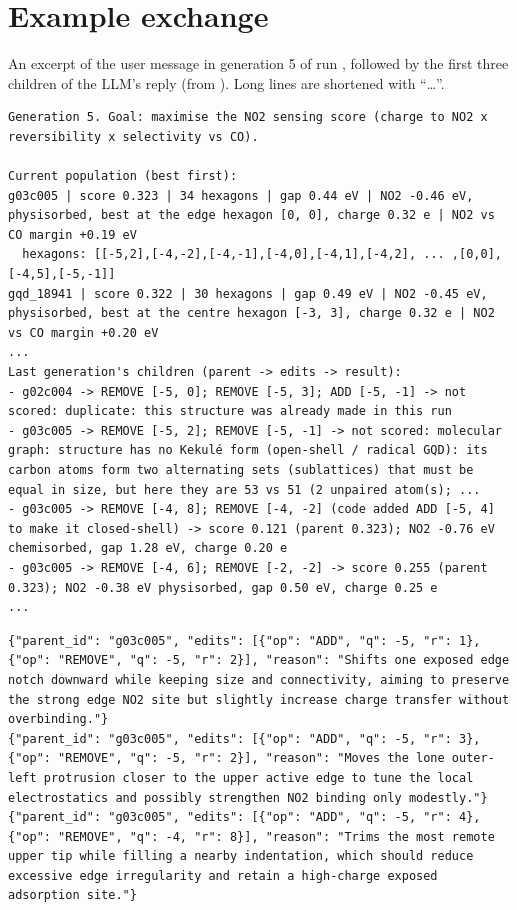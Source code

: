 \section{Example exchange}

An excerpt of the user message in generation 5 of run , followed by the first
three children of the LLM's reply (from ). Long lines are shortened with
``\ldots''.

\begin{lstlisting}
Generation 5. Goal: maximise the NO2 sensing score (charge to NO2 x reversibility x selectivity vs CO).

Current population (best first):
g03c005 | score 0.323 | 34 hexagons | gap 0.44 eV | NO2 -0.46 eV, physisorbed, best at the edge hexagon [0, 0], charge 0.32 e | NO2 vs CO margin +0.19 eV
  hexagons: [[-5,2],[-4,-2],[-4,-1],[-4,0],[-4,1],[-4,2], ... ,[0,0],[-4,5],[-5,-1]]
gqd_18941 | score 0.322 | 30 hexagons | gap 0.49 eV | NO2 -0.45 eV, physisorbed, best at the centre hexagon [-3, 3], charge 0.32 e | NO2 vs CO margin +0.20 eV
...
Last generation's children (parent -> edits -> result):
- g02c004 -> REMOVE [-5, 0]; REMOVE [-5, 3]; ADD [-5, -1] -> not scored: duplicate: this structure was already made in this run
- g03c005 -> REMOVE [-5, 2]; REMOVE [-5, -1] -> not scored: molecular graph: structure has no Kekulé form (open-shell / radical GQD): its carbon atoms form two alternating sets (sublattices) that must be equal in size, but here they are 53 vs 51 (2 unpaired atom(s); ...
- g03c005 -> REMOVE [-4, 8]; REMOVE [-4, -2] (code added ADD [-5, 4] to make it closed-shell) -> score 0.121 (parent 0.323); NO2 -0.76 eV chemisorbed, gap 1.28 eV, charge 0.20 e
- g03c005 -> REMOVE [-4, 6]; REMOVE [-2, -2] -> score 0.255 (parent 0.323); NO2 -0.38 eV physisorbed, gap 0.50 eV, charge 0.25 e
...
\end{lstlisting}

\begin{lstlisting}
{"parent_id": "g03c005", "edits": [{"op": "ADD", "q": -5, "r": 1}, {"op": "REMOVE", "q": -5, "r": 2}], "reason": "Shifts one exposed edge notch downward while keeping size and connectivity, aiming to preserve the strong edge NO2 site but slightly increase charge transfer without overbinding."}
{"parent_id": "g03c005", "edits": [{"op": "ADD", "q": -5, "r": 3}, {"op": "REMOVE", "q": -5, "r": 2}], "reason": "Moves the lone outer-left protrusion closer to the upper active edge to tune the local electrostatics and possibly strengthen NO2 binding only modestly."}
{"parent_id": "g03c005", "edits": [{"op": "ADD", "q": -5, "r": 4}, {"op": "REMOVE", "q": -4, "r": 8}], "reason": "Trims the most remote upper tip while filling a nearby indentation, which should reduce excessive edge irregularity and retain a high-charge exposed adsorption site."}
\end{lstlisting}
